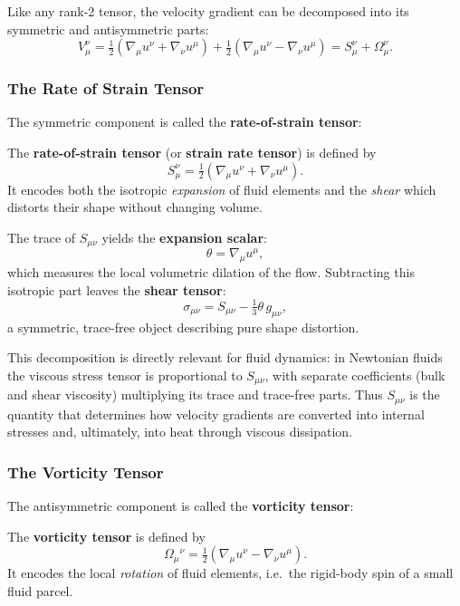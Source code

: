 \par
Like any rank-2 tensor, the velocity gradient can be decomposed into its symmetric and antisymmetric parts:
\[
V_{\mu}^\nu 
= \tfrac{1}{2}\left(\nabla_\mu u^\nu + \nabla_\nu u^\mu\right) 
+ \tfrac{1}{2}\left(\nabla_\mu u^\nu - \nabla_\nu u^\mu\right) 
= S_{\mu}^\nu + \Omega_\mu^\nu.
\]

\subsubsection*{The Rate of Strain Tensor}

The symmetric component is called the \textbf{rate-of-strain tensor}:
\vspace{0.5cm}
\begin{definition}
The \textbf{rate-of-strain tensor} (or \textbf{strain rate tensor}) is defined by
\[
S_{\mu}^\nu = \tfrac{1}{2}\left(\nabla_\mu u^\nu + \nabla_\nu u^\mu\right).
\]
It encodes both the isotropic \emph{expansion} of fluid elements and the \emph{shear} which distorts their shape without changing volume.
\end{definition}
\vspace{0.5cm}

The trace of $S_{\mu\nu}$ yields the \textbf{expansion scalar}:
\[
\theta = \nabla_\mu u^\mu,
\]
which measures the local volumetric dilation of the flow. Subtracting this isotropic part leaves the \textbf{shear tensor}:
\[
\sigma_{\mu\nu} = S_{\mu\nu} - \tfrac{1}{3}\theta\, g_{\mu\nu},
\]
a symmetric, trace-free object describing pure shape distortion. 

\par
This decomposition is directly relevant for fluid dynamics: in Newtonian fluids the viscous stress tensor is proportional to $S_{\mu\nu}$, with separate coefficients (bulk and shear viscosity) multiplying its trace and trace-free parts. Thus $S_{\mu\nu}$ is the quantity that determines how velocity gradients are converted into internal stresses and, ultimately, into heat through viscous dissipation.

\subsubsection*{The Vorticity Tensor}

The antisymmetric component is called the \textbf{vorticity tensor}:
\vspace{0.5cm}
\begin{definition}
\label{def:vorticity}
The \textbf{vorticity tensor} is defined by
\[
\Omega_{\mu}{}^{\nu} = \tfrac{1}{2}\left(\nabla_\mu u^\nu - \nabla_\nu u^\mu\right).
\]
It encodes the local \emph{rotation} of fluid elements, i.e.\ the rigid-body spin of a small fluid parcel.
\end{definition}
\vspace{0.5cm}


